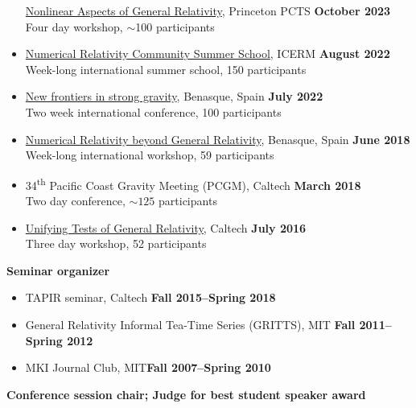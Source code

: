 \documentclass[margin,line]{res}
\begin{document}
\begin{resume}
\begin{itemize}
  \href{https://pcts.princeton.edu/events/2023/nonlinear-aspects-general-relativity}
  {Nonlinear Aspects of General Relativity},
  Princeton PCTS \hfill {\bf October 2023}\\
\hspace*{1em} Four day workshop, $\sim$100 participants
\item[]
  \href{https://icerm.brown.edu/events/re-22-f20w1/}
  {Numerical Relativity Community Summer School},
  ICERM \hfill {\bf August 2022} \\
\hspace*{1em} Week-long international summer school, 150 participants
\item[]
  \href{https://www.benasque.org/2022relativity/}
  {New frontiers in strong gravity},
  Benasque, Spain \hfill {\bf July 2022} \\
\hspace*{1em} Two week international conference, 100 participants
\item[]
  \href{http://www.benasque.org/2018relativity/}
  {Numerical Relativity beyond General Relativity},
  Benasque, Spain \hfill {\bf June 2018} \\
\hspace*{1em} Week-long international workshop, 59 participants
\item[]
34\textsuperscript{th} Pacific Coast Gravity Meeting (PCGM),
Caltech
\hfill {\bf March 2018}\\
\hspace*{1em} Two day conference, $\sim 125$ participants
\item[]
  \href{http://www.tapir.caltech.edu/~unifying-gr-tests/}
  {Unifying Tests of General Relativity},
  Caltech \hfill {\bf July 2016} \\
\hspace*{1em} Three day workshop, 52 participants
\end{itemize}
{\bf Seminar organizer}
\vspace*{.05in}
\begin{itemize}
\item[] TAPIR seminar, Caltech\hfill
  {\bf Fall 2015--Spring 2018}
\item[] General Relativity Informal Tea-Time Series (GRITTS), MIT\hfill
  {\bf Fall 2011--Spring 2012}
\item[] MKI Journal Club, MIT\hfill {\bf Fall 2007--Spring 2010}
\end{itemize}
{\bf Conference session chair; Judge for best student speaker award}
\vspace*{.05in}

\end{resume}
\end{document}
